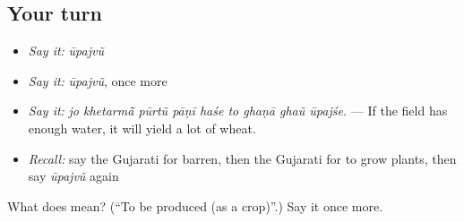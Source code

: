 \subsection*{Your turn}
\begin{itemize}
\raggedright
  \item \emph{Say it:} \emph{ūpajvũ}
  \item \emph{Say it:} \emph{ūpajvũ}, once more
  \item \emph{Say it:} \emph{jo khetarmā̃ pūrtũ pāṇī haśe to ghaṇā ghaũ ūpajśe.} — If the field has enough water, it will yield a lot of wheat.
  \item \emph{Recall:} say the Gujarati for barren, then the Gujarati for to grow plants, then say \emph{ūpajvũ} again
\end{itemize}

\begin{tcolorbox}[breakable,colback=teal!4,colframe=teal!35!black,title={Before you move on}]
What does  mean? (\textquotedblleft{}To be produced (as a crop)\textquotedblright{}.) Say it once more.
\end{tcolorbox}
